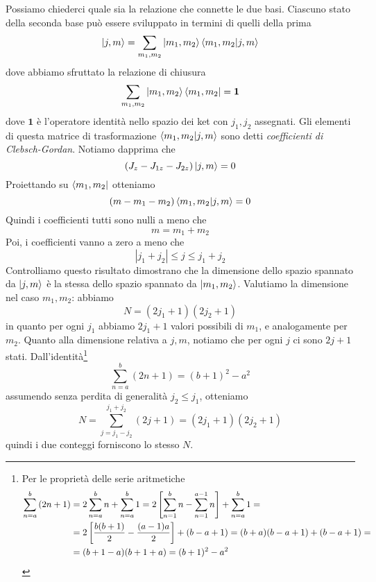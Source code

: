 Possiamo chiederci quale sia la relazione che connette le due basi. Ciascuno stato della seconda base può essere sviluppato in termini di quelli della prima
\begin{equation} \label{eqn:ketjm}
\ket{j,m}=\sum_{m_1,m_2}{\ket{m_1,m_2}\braket{m_1,m_2|j,m}}
\end{equation}
dove abbiamo sfruttato la relazione di chiusura
\begin{equation}
\sum_{m_1,m_2}\ket{m_1,m_2}\bra{m_1,m_2}=\textbf{1}
\end{equation}
dove $\textbf{1}$ è l'operatore identità nello spazio dei ket con $j_1,j_2$ assegnati. Gli elementi di questa matrice di trasformazione $\braket{m_1,m_2|j,m}$ sono detti \textit{coefficienti di Clebsch-Gordan}. Notiamo dapprima che
\begin{equation}
(J_z-J_{1z}-J_{2z})\ket{j,m}=0
\end{equation}
Proiettando su $\bra{m_1,m_2}$ otteniamo
\begin{equation}
(m-m_1-m_2)\braket{m_1,m_2|j,m}=0
\end{equation}
Quindi i coefficienti tutti sono nulli a meno che
\begin{equation}
m=m_1+m_2
\end{equation}
Poi, i coefficienti vanno a zero a meno che
\begin{equation}
|j_1+j_2| \leq j \leq j_1+j_2
\end{equation}
Controlliamo questo risultato dimostrano che la dimensione dello spazio spannato da $\ket{j,m}$ è la stessa dello spazio spannato da $\ket{m_1,m_2}$. Valutiamo la dimensione nel caso $m_1,m_2$: abbiamo
\begin{equation}
N=(2j_1+1)(2j_2+1)
\end{equation}
in quanto per ogni $j_1$ abbiamo $2j_1+1$ valori possibili di $m_1$, e analogamente per $m_2$. Quanto alla dimensione relativa a $j,m$, notiamo che per ogni $j$ ci sono $2j+1$ stati. Dall'identità\footnote{Per le proprietà delle serie aritmetiche
\begin{equation} \notag \begin{split}
\sum_{n=a}^b{(2n+1)} &= 2\sum_{n=a}^b{n}+\sum_{n=a}^b{1}=2\left[\sum_{n=1}^b{n}-\sum_{n=1}^{a-1}{n}\right]+\sum_{n=a}^b{1}= \\
&= 2\left[\frac{b(b+1)}{2}-\frac{(a-1)a}{2}\right]+(b-a+1)=(b+a)(b-a+1)+(b-a+1)= \\
&= (b+1-a)(b+1+a)=(b+1)^2-a^2 
\end{split}\end{equation} }
\begin{equation}
\sum_{n=a}^b{(2n+1)}=(b+1)^2-a^2
\end{equation}
assumendo senza perdita di generalità $j_2\leq j_1$, otteniamo
\begin{equation}
N=\sum_{j=j_1-j_2}^{j_1+j_2}{(2j+1)}=(2j_1+1)(2j_2+1)
\end{equation}
quindi i due conteggi forniscono lo stesso $N$.

